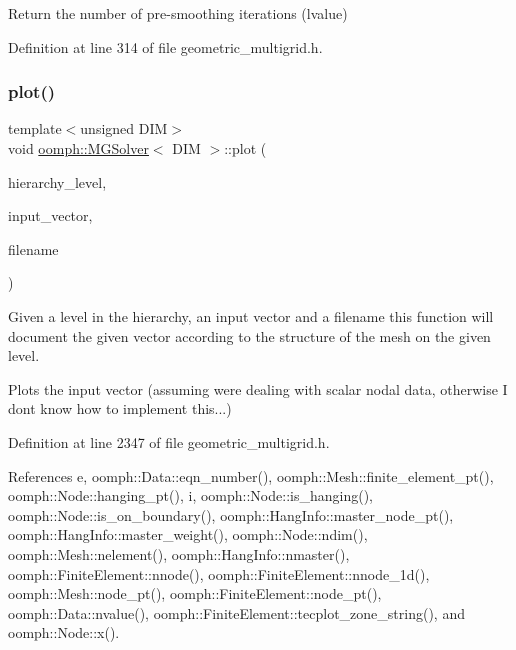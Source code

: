 Return the number of pre-\/smoothing iterations (lvalue) 



Definition at line 314 of file geometric\+\_\+multigrid.\+h.

\mbox{\label{classoomph_1_1MGSolver_a4af1269b75f9dcd598474d242de1f4ef}} 
\subsubsection{\texorpdfstring{plot()}{plot()}}
{\footnotesize\ttfamily template$<$unsigned D\+IM$>$ \\
void \hyperlink{classoomph_1_1MGSolver}{oomph\+::\+M\+G\+Solver}$<$ D\+IM $>$\+::plot (\begin{DoxyParamCaption}\item[{const unsigned \&}]{hierarchy\+\_\+level,  }\item[{const \hyperlink{classoomph_1_1DoubleVector}{Double\+Vector} \&}]{input\+\_\+vector,  }\item[{const std\+::string \&}]{filename }\end{DoxyParamCaption})}



Given a level in the hierarchy, an input vector and a filename this function will document the given vector according to the structure of the mesh on the given level. 

Plots the input vector (assuming we\textquotesingle{}re dealing with scalar nodal data, otherwise I don\textquotesingle{}t know how to implement this...) 

Definition at line 2347 of file geometric\+\_\+multigrid.\+h.



References e, oomph\+::\+Data\+::eqn\+\_\+number(), oomph\+::\+Mesh\+::finite\+\_\+element\+\_\+pt(), oomph\+::\+Node\+::hanging\+\_\+pt(), i, oomph\+::\+Node\+::is\+\_\+hanging(), oomph\+::\+Node\+::is\+\_\+on\+\_\+boundary(), oomph\+::\+Hang\+Info\+::master\+\_\+node\+\_\+pt(), oomph\+::\+Hang\+Info\+::master\+\_\+weight(), oomph\+::\+Node\+::ndim(), oomph\+::\+Mesh\+::nelement(), oomph\+::\+Hang\+Info\+::nmaster(), oomph\+::\+Finite\+Element\+::nnode(), oomph\+::\+Finite\+Element\+::nnode\+\_\+1d(), oomph\+::\+Mesh\+::node\+\_\+pt(), oomph\+::\+Finite\+Element\+::node\+\_\+pt(), oomph\+::\+Data\+::nvalue(), oomph\+::\+Finite\+Element\+::tecplot\+\_\+zone\+\_\+string(), and oomph\+::\+Node\+::x().

